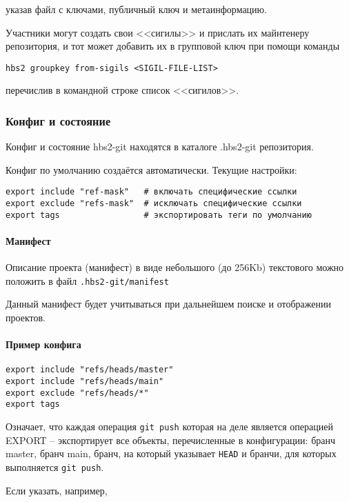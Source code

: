 \documentclass[11pt,a4paper]{article}
\begin{document}
указав файл с ключами, публичный ключ и метаинформацию.

Участники могут создать свои <<сигилы>> и прислать их майнтенеру репозитория,
и тот может добавить их в групповой ключ при помощи команды

\texttt{hbs2 groupkey from-sigils <SIGIL-FILE-LIST>}

перечислив в командной строке список <<сигилов>>.

\subsubsection{Конфиг и состояние}

Конфиг и состояние hbs2-git находятся в каталоге .hbs2-git репозитория.

Конфиг по умолчанию создаётся автоматически. Текущие настройки:

\begin{verbatim}
export include "ref-mask"   # включать специфические ссылки
export exclude "refs-mask"  # исключать специфические ссылки
export tags                 # экспортировать теги по умолчанию
\end{verbatim}

\paragraph{Манифест}

Описание проекта (манифест) в виде небольшого (до 256Kb)
текстового можно положить в файл \texttt{.hbs2-git/manifest}

Данный манифест будет учитываться при дальнейшем поиске и отображении проектов.

\paragraph{Пример конфига}

\begin{verbatim}
export include "refs/heads/master"
export include "refs/heads/main"
export exclude "refs/heads/*"
export tags
\end{verbatim}

Означает, что каждая операция \texttt{git push} которая на деле является операцией EXPORT --
экспортирует все объекты, перечисленные в конфигурации: бранч master, бранч main, бранч, на который
указывает \texttt{HEAD} и бранчи, для которых выполняется \texttt{git push}.

Если указать, например,
\end{document}
